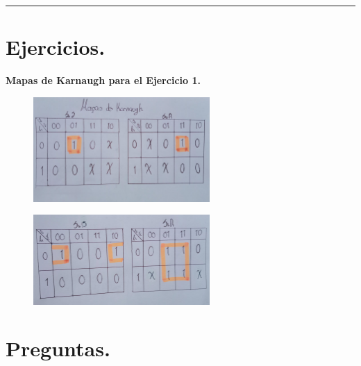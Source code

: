 \documentclass[12pt,letterpaper]{article}
\begin{document}
\bigskip
\hrule height 0.1pt
\bigskip

\section*{Ejercicios.}

\textbf{Mapas de Karnaugh para el Ejercicio 1.}
\begin{figure}[H]
  \centering
  \includegraphics[width=0.6\textwidth]{karnaugh1.png}
\end{figure}

\begin{figure}[H]
  \centering
  \includegraphics[width=0.6\textwidth]{Karnaugh2.png}
\end{figure}


\section*{Preguntas.}
\end{document}
